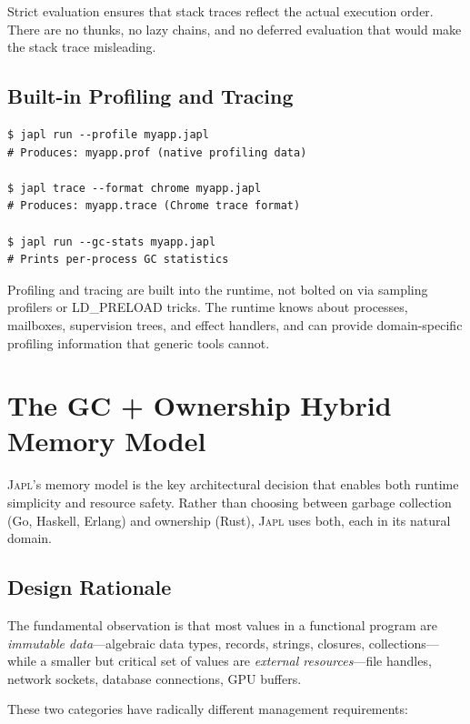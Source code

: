 \documentclass[11pt,twocolumn]{article}
\newcommand{\japl}{\textsc{Japl}}
\begin{document}
Strict evaluation ensures that stack traces reflect the actual execution order.
There are no thunks, no lazy chains, and no deferred evaluation that would make the stack trace misleading.

\subsection{Built-in Profiling and Tracing}

\begin{lstlisting}[language=shell]
$ japl run --profile myapp.japl
# Produces: myapp.prof (native profiling data)

$ japl trace --format chrome myapp.japl
# Produces: myapp.trace (Chrome trace format)

$ japl run --gc-stats myapp.japl
# Prints per-process GC statistics
\end{lstlisting}

Profiling and tracing are built into the runtime, not bolted on via sampling profilers or LD\_PRELOAD tricks.
The runtime knows about processes, mailboxes, supervision trees, and effect handlers, and can provide domain-specific profiling information that generic tools cannot.

\section{The GC + Ownership Hybrid Memory Model}
\label{sec:memory-model}

\japl{}'s memory model is the key architectural decision that enables both runtime simplicity and resource safety.
Rather than choosing between garbage collection (Go, Haskell, Erlang) and ownership (Rust), \japl{} uses both, each in its natural domain.

\subsection{Design Rationale}

The fundamental observation is that most values in a functional program are \emph{immutable data}---algebraic data types, records, strings, closures, collections---while a smaller but critical set of values are \emph{external resources}---file handles, network sockets, database connections, GPU buffers.

These two categories have radically different management requirements:
\end{document}
